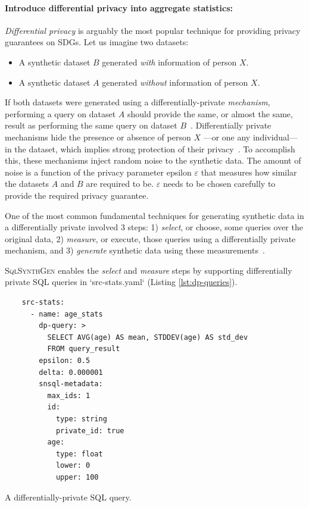 \documentclass[11pt]{article}
\begin{document}
\paragraph{Introduce differential privacy into aggregate statistics:}

\emph{Differential privacy} is arguably the most popular technique for providing privacy guarantees on SDGs.
Let us imagine two datasets:

\begin{itemize}
    \item A synthetic dataset $B$ generated \emph{with} information of person $X$.
    \item A synthetic dataset $A$ generated \emph{without} information of person $X$.
\end{itemize}

If both datasets were generated using a differentially-private \emph{mechanism}, performing a query on dataset $A$ should provide the same, or almost the same, result as performing the same query on dataset $B$~\cite{Kopp2021MicrosoftSD}.
Differentially private mechanisms hide the presence or absence of person $X$ ---or one any individual--- in the dataset, which implies strong protection of their privacy~\cite{near2021}.
To accomplish this, these mechanisms inject random noise to the synthetic data.
The amount of noise is a function of the privacy parameter epsilon $\varepsilon$ that measures how similar the datasets $A$ and $B$ are required to be. $\varepsilon$ needs to be chosen carefully to provide the required privacy guarantee.

One of the most common fundamental techniques for generating synthetic data in a differentially private involved 3 steps: 1) \emph{select}, or choose, some queries over the original data, 2) \emph{measure}, or execute, those queries using a differentially private mechanism, and 3) \emph{generate} synthetic data using these measurements~\cite{DBLP:journals/pvldb/McKennaMSM22}.

\textsc{SqlSynthGen} enables the \emph{select} and \emph{measure} steps by supporting differentially private SQL queries in `src-stats.yaml`  (Listing \ref{lst:dp-queries}).

\begin{listing}[H]
\begin{verbatim}
    src-stats:
      - name: age_stats
        dp-query: >
          SELECT AVG(age) AS mean, STDDEV(age) AS std_dev
          FROM query_result
        epsilon: 0.5
        delta: 0.000001
        snsql-metadata:
          max_ids: 1
          id:
            type: string
            private_id: true
          age:
            type: float
            lower: 0
            upper: 100
\end{verbatim}
\caption{A differentially-private SQL query. }
\label{lst:dp-queries}
\end{listing}
\end{document}
